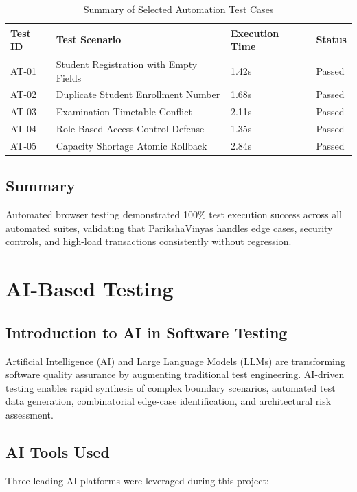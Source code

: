 \documentclass{InternshipReport}
\begin{document}
\begin{table}[H]
\centering
\caption{Summary of Selected Automation Test Cases}
\label{tab:automation_summary}
\begin{tabular}{p{} p{} p{} p{}}
\toprule
\textbf{Test ID} & \textbf{Test Scenario} & \textbf{Execution Time} & \textbf{Status} \\
\midrule
AT-01 & Student Registration with Empty Fields & 1.42s & Passed \\
AT-02 & Duplicate Student Enrollment Number & 1.68s & Passed \\
AT-03 & Examination Timetable Conflict & 2.11s & Passed \\
AT-04 & Role-Based Access Control Defense & 1.35s & Passed \\
AT-05 & Capacity Shortage Atomic Rollback & 2.84s & Passed \\
\bottomrule
\end{tabular}
\end{table}

\section{Summary}
Automated browser testing demonstrated 100\% test execution success across all automated suites, validating that ParikshaVinyas handles edge cases, security controls, and high-load transactions consistently without regression.


\chapter{AI-Based Testing}

\section{Introduction to AI in Software Testing}
Artificial Intelligence (AI) and Large Language Models (LLMs) are transforming software quality assurance by augmenting traditional test engineering. AI-driven testing enables rapid synthesis of complex boundary scenarios, automated test data generation, combinatorial edge-case identification, and architectural risk assessment.

\section{AI Tools Used}
Three leading AI platforms were leveraged during this project:
\end{document}
